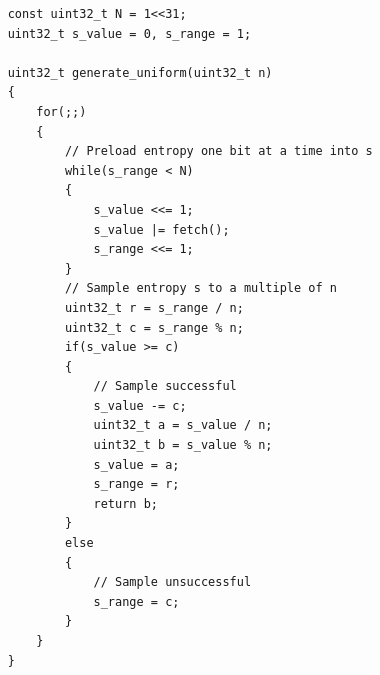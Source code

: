 \documentclass[12pt]{article}
\begin{document}
\begin{verbatim}
    const uint32_t N = 1<<31;
    uint32_t s_value = 0, s_range = 1;

    uint32_t generate_uniform(uint32_t n)
    {
        for(;;)
        {
            // Preload entropy one bit at a time into s
            while(s_range < N)
            {
                s_value <<= 1;
                s_value |= fetch();
                s_range <<= 1;
            }
            // Sample entropy s to a multiple of n
            uint32_t r = s_range / n;
            uint32_t c = s_range % n;
            if(s_value >= c)
            {
                // Sample successful
                s_value -= c;
                uint32_t a = s_value / n;
                uint32_t b = s_value % n;
                s_value = a;
                s_range = r; 
                return b;
            }
            else
            {
                // Sample unsuccessful
                s_range = c;
            }
        }
    }
\end{verbatim}
\end{document}
